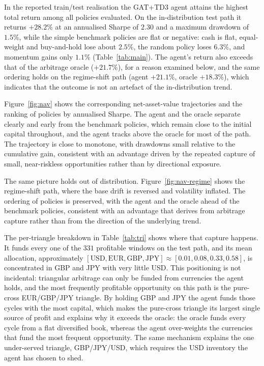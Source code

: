 \documentclass[12pt,a4paper]{article}
\begin{document}
In the reported train/test realisation the GAT+TD3 agent attains the highest total return
among all policies evaluated. On the in-distribution test path it returns $+28.2\%$ at an
annualised Sharpe of $2.30$ and a maximum drawdown of $1.5\%$, while the simple benchmark
policies are flat or negative: cash is flat, equal-weight and buy-and-hold lose about
$2.5\%$, the random policy loses $6.3\%$, and momentum gains only $1.1\%$
(Table~\ref{tab:main}). The agent's return also exceeds that of the arbitrage oracle
($+21.7\%$), for a reason examined below, and the same ordering holds on the regime-shift path
(agent $+21.1\%$, oracle $+18.3\%$), which indicates that the outcome is not an artefact of the
in-distribution trend.

Figure~\ref{fig:nav} shows the corresponding net-asset-value trajectories and the ranking of
policies by annualised Sharpe. The agent and the oracle separate clearly and early from the
benchmark policies, which remain close to the initial capital throughout, and the agent tracks
above the oracle for most of the path. The trajectory is close to monotone, with drawdowns
small relative to the cumulative gain, consistent with an advantage driven by the repeated
capture of small, near-riskless opportunities rather than by directional exposure.

The same picture holds out of distribution. Figure~\ref{fig:nav-regime} shows the regime-shift
path, where the base drift is reversed and volatility inflated. The ordering of policies is
preserved, with the agent and the oracle ahead of the benchmark policies, consistent with an
advantage that derives from arbitrage capture rather than from the direction of the underlying
trend.

The per-triangle breakdown in Table~\ref{tab:tri} shows where that capture happens. It
funds every one of the $331$ profitable windows on the test path, and its mean allocation,
approximately $[\text{USD},\text{EUR},\text{GBP},\text{JPY}]\approx[0.01,0.08,0.33,0.58]$, is
concentrated in GBP and JPY with very little USD. This positioning is not incidental:
triangular arbitrage can only be funded from currencies the agent holds, and the most frequently
profitable opportunity on this path is the pure-cross EUR/GBP/JPY triangle. By holding GBP and
JPY the agent funds those cycles with the most capital, which makes the pure-cross triangle its
largest single source of profit and explains why it exceeds the oracle: the oracle funds every
cycle from a flat diversified book, whereas the agent over-weights the currencies that fund the
most frequent opportunity. The same mechanism explains the one under-served triangle,
GBP/JPY/USD, which requires the USD inventory the agent has chosen to shed.
\end{document}
